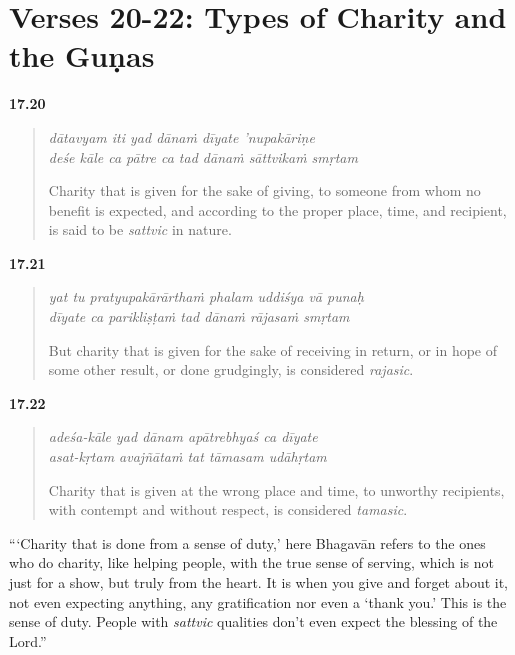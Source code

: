 \section{Verses 20-22: Types of Charity and the Guṇas}\label{sec-verses-20-22-types-of-charity-and-the-gunas}


\par\noindent\textbf{17.20}\par
\begin{verse}
\textit{dātavyam iti yad dānaṁ dīyate ’nupakāriṇe} \\
\textit{deśe kāle ca pātre ca tad dānaṁ sāttvikaṁ smṛtam}

\noindent Charity that is given for the sake of giving, to someone from whom no benefit is expected, and according to the proper place, time, and recipient, is said to be \textit{sattvic} in nature.
\end{verse}
\par



\par\noindent\textbf{17.21}\par
\begin{verse}
\textit{yat tu pratyupakārārthaṁ phalam uddiśya vā punaḥ} \\
\textit{dīyate ca parikliṣṭaṁ tad dānaṁ rājasaṁ smṛtam}

\noindent But charity that is given for the sake of receiving in return, or in hope of some other result, or done grudgingly, is considered \textit{rajasic}.
\end{verse}
\par



\par\noindent\textbf{17.22}\par
\begin{verse}
\textit{adeśa-kāle yad dānam apātrebhyaś ca dīyate} \\
\textit{asat-kṛtam avajñātaṁ tat tāmasam udāhṛtam}

\noindent Charity that is given at the wrong place and time, to unworthy recipients, with contempt and without respect, is considered \textit{tamasic}.
\end{verse}
\par


\enquote{\enquote{Charity that is done from a sense of duty,} here Bhagavān refers to the ones who do charity, like helping people, with the true sense of serving, which is not just for a show, but truly from the heart. It is when you give and forget about it, not even expecting anything, any gratification nor even a \enquote{thank you.} This is the sense of duty. People with \textit{sattvic} qualities don’t even expect the blessing of the Lord.}

